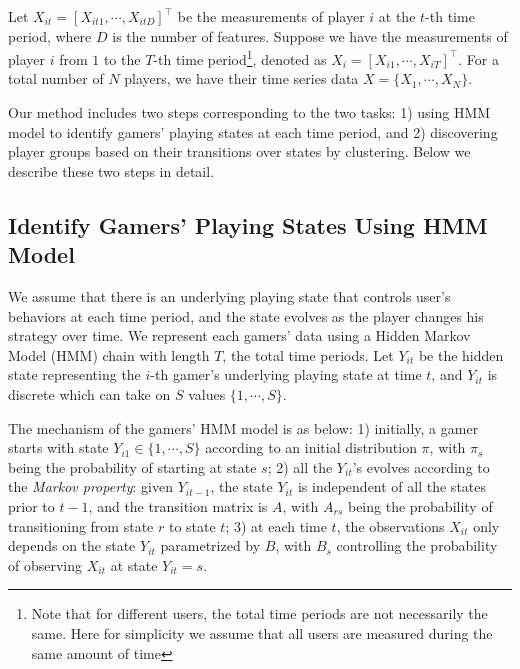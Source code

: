 Let $X_{it} = [X_{it1}, \cdots, X_{itD}]^\top$ be the measurements of player $i$ at the $t$-th time period, 
where $D$ is the number of features. Suppose we have the measurements of player $i$ from $1$ to the 
$T$-th time period\footnote{Note that for different users, the total time periods are not necessarily the same. 
Here for simplicity we assume that all users are measured during the same amount of time},
denoted as $X_{i} = [X_{i1}, \cdots, X_{iT}]^\top$. For a total number of $N$ players, we have their time series 
data $X = \{ X_1, \cdots, X_N \}$.

Our method includes two steps corresponding to the two tasks: 1) using HMM model to identify gamers' 
playing states at each time period, and 2) discovering player groups based on their transitions over states by clustering. 
Below we describe these two steps in detail.

\subsection{Identify Gamers' Playing States Using HMM Model}
We assume that there is an underlying playing state that controls
user’s behaviors at each time period, and the state evolves  as the player changes his strategy over
time. We represent each gamers' data using a Hidden Markov Model (HMM) \cite{hmm} chain with 
length $T$, the total time periods.  Let $Y_{it}$ be the hidden state representing 
the $i$-th gamer's underlying playing state at time $t$, and $Y_{it}$ is discrete which can take on $S$ values $\{1, \cdots, S\}$.


The mechanism of the gamers' HMM model is as below: 1) initially, a gamer starts with state 
$Y_{i1} \in \{1, \cdots, S\}$ according to an initial distribution $\pi$,  with $\pi_s$ being 
the probability of starting at state $s$; 2) all the $Y_{it}$'s  evolves according to the 
{\it Markov property}: given $Y_{i{t-1}}$, the state $Y_{it}$ is independent of all the 
states prior to $t-1$, and the transition matrix is $A$, with $A_{rs}$ being the probability of 
transitioning from state $r$ to state $t$; 3) at each time $t$, the observations $X_{it}$ only 
depends on the state $Y_{it}$ parametrized by $B$, with $B_s$ controlling the probability 
of observing $X_{it}$ at state $Y_{it} = s$. 


